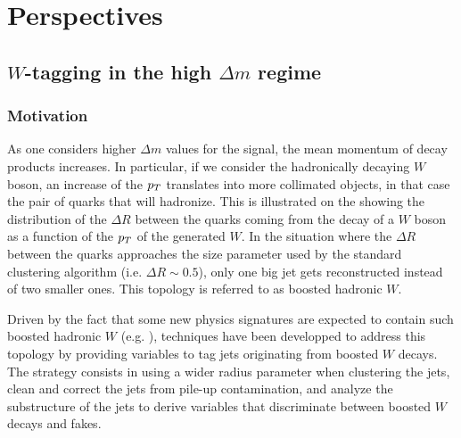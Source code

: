     \newpage

    \section{Perspectives \label{sec:analysis_perspective}}

    \subsection{$W$-tagging in the high $\Delta m$ regime}

            \subsubsection{Motivation}

             As one considers higher $\Delta m$ values for the signal, the mean momentum of
             decay products increases. In particular, if we consider the hadronically
             decaying $W$ boson, an increase of the $p_T$ translates into more collimated objects,
             in that case the pair of quarks that will hadronize. This is illustrated on
             the  showing the
             distribution of the $\Delta R$ between the
             quarks coming from the decay of a $W$ boson as a function of the $p_T$ of
             the generated
             $W$. In the situation where the $\Delta R$ between the quarks approaches the
             size parameter used by the standard clustering algorithm (i.e. $\Delta R
             \sim 0.5$), only one big jet gets reconstructed instead of two smaller ones.
             This topology is referred to as boosted hadronic $W$.


             Driven by the fact that some new physics signatures are expected to contain
             such boosted hadronic $W$ (e.g. \cite{SUS-12-024}), techniques have been developped to
             address this topology by providing variables to tag jets originating from
             boosted $W$ decays. The strategy consists in using a wider radius parameter
             when clustering the jets, clean and correct the jets from pile-up contamination,
             and analyze the substructure of the jets to derive variables that discriminate
             between boosted $W$ decays and fakes.

